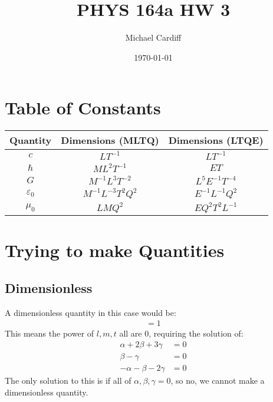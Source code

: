 \documentclass[12pt]{article}
\title{\vspace{-3em}PHYS 164a HW 3}
\author{Michael Cardiff}
\date{\today}
\begin{document}
\maketitle

\section{Table of Constants}
\begin{table}[H]
  \centering
  \begin{tabular}{c|c|c}
    Quantity & Dimensions (MLTQ) & Dimensions (LTQE) \\ \hline
    $c$             & $LT^{-1}$ & $LT^{-1}$ \\
    $\hbar$         & $ML^2T^{-1}$ & $ET$ \\
    $G$             & $M^{-1}L^3T^{-2}$ & $L^5E^{-1}T^{-4}$ \\
    $\varepsilon_0$ & $M^{-1}L^{-3}T^2Q^2$ & $E^{-1}L^{-1}Q^2$ \\
    $\mu_0$         & $LMQ^2$ & $E Q^2T^2L^{-1}$ 
  \end{tabular}
\end{table}

\section{Trying to make Quantities}

\subsection{Dimensionless}
A dimensionless quantity in this case would be:
\begin{align*}
  [c^\alpha\hbar^\beta G^\gamma]=1
\end{align*}
This means the power of $l,m,t$ all are $0$, requiring the solution of:
\begin{align*}
  \alpha+2\beta+3\gamma&=0\\
  \beta-\gamma&=0\\
  -\alpha-\beta-2\gamma&=0
\end{align*}
The only solution to this is if all of $\alpha,\beta,\gamma=0$, so no, we cannot make a dimensionless quantity.
\end{document}
